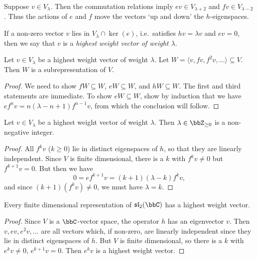 Suppose $v\in V_\lambda$. Then the commutation relations imply $ev\in
V_{\lambda+2}$ and $fv\in V_{\lambda-2}$. Thus the actions of $e$ and $f$ move
the vectors `up and down' the $h$-eigenspaces.

\begin{definition}
    If a non-zero vector $v$ lies in $V_\lambda\cap \ker(e)$, i.e.\ satisfies
    $hv=\lambda v$ and $ev = 0$, then we say that $v$ is a \emph{highest weight
    vector of weight $\lambda$}.
\end{definition}

\begin{lemma}
    Let $v\in V_\lambda$ be a highest weight vector of weight $\lambda$. Let
    $W=\langle v, fv, f^2v, \ldots \rangle\subseteq V$. Then $W$ is a
    subrepresentation of $V$.
    \begin{proof}
        We need to show $fW\subseteq W$, $eW\subseteq W$, and $hW\subseteq W$.
        The first and third statements are immediate. To show $eW\subseteq W$,
        show by induction that we have $ef^n v = n(\lambda-n +1)f^{n-1}v$, from
        which the conclusion will follow.
    \end{proof}
\end{lemma}

\begin{lemma}
    Let $v\in V_\lambda$ be a highest weight vector
    of weight $\lambda$. Then $\lambda \in \bbZ_{\geq 0}$ is a non-negative integer.
    \begin{proof}
        All $f^k v$ ($k\geq 0$) lie in distinct eigenspaces of $h$, so that they
        are linearly independent. Since $V$ is finite dimensional, there is a
        $k$ with $f^kv \neq 0$ but $f^{k+1}v= 0$. But then we have \[0=ef^{k+1}v
        = (k+1)(\lambda-k)f^k v,\]
        and since $(k+1)(f^k v)\neq 0$, we must have $\lambda=k$.
    \end{proof}
\end{lemma}

\begin{lemma}
    Every finite dimensional representation of $\sl_2(\bbC)$ has a highest
    weight vector.
    \begin{proof}
        Since $V$ is a $\bbC$-vector space, the operator $h$ has an eigenvector
        $v$. Then $v, ev, e^2v, \ldots$ are all vectors which, if non-zero, are
        linearly independent since they lie in distinct eigenspaces of $h$. But
        $V$ is finite dimensional, so there is a $k$ with $e^k v \neq 0$,
        $e^{k+1}v=0$. Then $e^kv$ is a highest weight vector.
    \end{proof}
\end{lemma}

